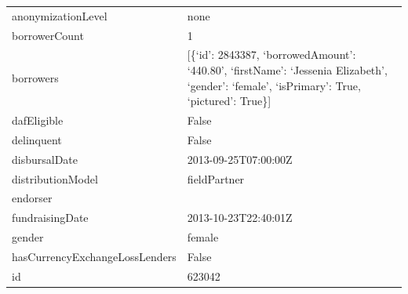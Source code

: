 \begin{longtable}{|p{}|p{}|}
	anonymizationLevel                              & none                                                                                                          \\
	borrowerCount                                   & 1                                                                                                             \\
	borrowers                                       & {[}\{`id': 2843387, `borrowedAmount': `440.80', `firstName':
	`Jessenia Elizabeth', `gender': `female', `isPrimary': True, `pictured':
	True\}{]}                                                                                                                                                       \\
	dafEligible                                     & False                                                                                                         \\
	delinquent                                      & False                                                                                                         \\
	disbursalDate                                   & 2013-09-25T07:00:00Z                                                                                          \\
	distributionModel                               & fieldPartner                                                                                                  \\
	endorser                                        &                                                                                                               \\
	fundraisingDate                                 & 2013-10-23T22:40:01Z                                                                                          \\
	gender                                          & female                                                                                                        \\
	hasCurrencyExchangeLossLenders                  & False                                                                                                         \\
	id                                              & 623042                                                                                                        \\

\end{longtable}
